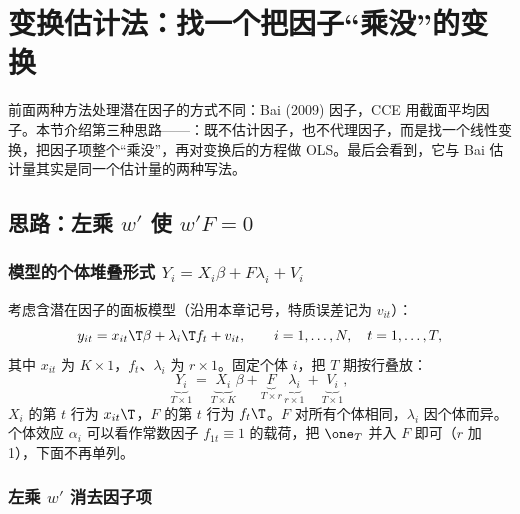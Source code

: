 
\section{变换估计法：找一个把因子“乘没”的变换}\label{sec:U14b-trans}

前面两种方法处理潜在因子的方式不同：Bai (2009) 因子，CCE 用截面平均因子。本节介绍第三种思路——：既不估计因子，也不代理因子，而是找一个线性变换，把因子项整个“乘没”，再对变换后的方程做 OLS。最后会看到，它与 Bai 估计量其实是同一个估计量的两种写法。

\subsection{思路：左乘 \texorpdfstring{$w'$}{w'} 使 \texorpdfstring{$w'F=0$}{w'F = 0}}\label{sec:U14b-idea}

\subsubsection{模型的个体堆叠形式 \texorpdfstring{$Y_i=X_i\beta+F\lambda_i+V_i$}{Y\_i = X\_i beta + F lambda\_i + V\_i}}

考虑含潜在因子的面板模型（沿用本章记号，特质误差记为 $v_{it}$）：
\[
y_{it}=x_{it}\T\beta+\lambda_i\T f_t+v_{it},\qquad i=1,\dots,N,\quad t=1,\dots,T,
\]
其中 $x_{it}$ 为 $K\times1$，$f_t$、$\lambda_i$ 为 $r\times1$。固定个体 $i$，把 $T$ 期按行叠放：
\begin{equation}\label{eq:U14b-stack}
\underbrace{Y_i}_{T\times1}=\underbrace{X_i}_{T\times K}\beta+\underbrace{F}_{T\times r}\,\underbrace{\lambda_i}_{r\times1}+\underbrace{V_i}_{T\times1},
\end{equation}
$X_i$ 的第 $t$ 行为 $x_{it}\T$，$F$ 的第 $t$ 行为 $f_t\T$。$F$ 对所有个体相同，$\lambda_i$ 因个体而异。个体效应 $\alpha_i$ 可以看作常数因子 $f_{1t}\equiv1$ 的载荷，把 $\one_T$ 并入 $F$ 即可（$r$ 加 1），下面不再单列。

\subsubsection{左乘 \texorpdfstring{$w'$}{w'} 消去因子项}

